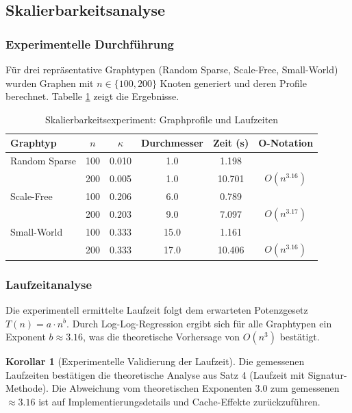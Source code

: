 ﻿\documentclass[a4paper,12pt]{article}
\theoremstyle{definition}
\newtheorem{korollar}{Korollar}
\begin{document}
	\subsection{Skalierbarkeitsanalyse}
	
	\subsubsection{Experimentelle Durchführung}
	
	Für drei repräsentative Graphtypen (Random Sparse, Scale-Free, Small-World) wurden Graphen mit $n \in \{100, 200\}$ Knoten generiert und deren Profile berechnet. Tabelle \ref{tab:scalability} zeigt die Ergebnisse.
	
	\begin{table}[H]
		\centering
		\caption{Skalierbarkeitsexperiment: Graphprofile und Laufzeiten}
		\label{tab:scalability}
		\begin{tabular}{lccccc}
			\hline
			\textbf{Graphtyp} & $n$ & $\kappa$ & \textbf{Durchmesser} & \textbf{Zeit (s)} & \textbf{O-Notation} \\
			\hline
			Random Sparse & 100 & 0.010 & 1.0 & 1.198 & \\
			& 200 & 0.005 & 1.0 & 10.701 & $O(n^{3.16})$ \\
			\hline
			Scale-Free & 100 & 0.206 & 6.0 & 0.789 & \\
			& 200 & 0.203 & 9.0 & 7.097 & $O(n^{3.17})$ \\
			\hline
			Small-World & 100 & 0.333 & 15.0 & 1.161 & \\
			& 200 & 0.333 & 17.0 & 10.406 & $O(n^{3.16})$ \\
			\hline
		\end{tabular}
	\end{table}
	
	\subsubsection{Laufzeitanalyse}
	
	Die experimentell ermittelte Laufzeit folgt dem erwarteten Potenzgesetz $T(n) = a \cdot n^b$. Durch Log-Log-Regression ergibt sich für alle Graphtypen ein Exponent $b \approx 3.16$, was die theoretische Vorhersage von $O(n^3)$ bestätigt.
	
	\begin{korollar}[Experimentelle Validierung der Laufzeit]
		Die gemessenen Laufzeiten bestä\-tigen die theoretische Analyse aus Satz 4 (Laufzeit mit Signatur-Methode). Die Abweichung vom theoretischen Exponenten $3.0$ zum gemessenen $\approx 3.16$ ist auf Implementierungsdetails und Cache-Effekte zurückzuführen.
	\end{korollar}
	
\end{document}
